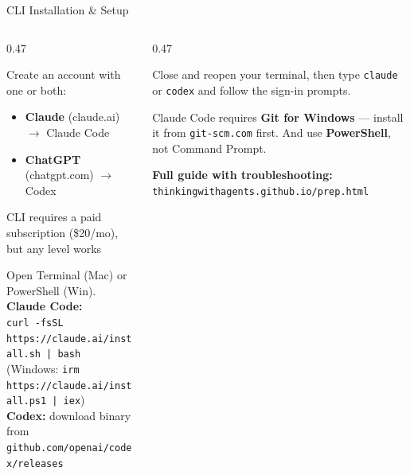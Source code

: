 \documentclass[aspectratio=169, 10pt]{beamer}
\begin{document}
\begin{frame}[fragile]{CLI Installation \& Setup}
\begin{columns}[T]
\begin{column}{0.47\textwidth}
\begin{tcolorbox}[keybox, title={\faUserPlus\quad Step 1: Accounts}]
\small
Create an account with one or both:
\begin{itemize}\setlength{\itemsep}{1pt}
  \item \textbf{Claude} (claude.ai) $\rightarrow$ Claude Code
  \item \textbf{ChatGPT} (chatgpt.com) $\rightarrow$ Codex
\end{itemize}
\vskip2pt
CLI requires a paid subscription (\$20/mo), but any level works
\end{tcolorbox}
\vskip3pt
\begin{tcolorbox}[keybox, title={\faTerminal\quad Step 2: Install}]
\small
Open Terminal (Mac) or PowerShell (Win).\\[4pt]
\textbf{Claude Code:}\\[2pt]
\texttt{\scriptsize curl -fsSL https://claude.ai/install.sh | bash}\\[2pt]
{\scriptsize (Windows: \texttt{irm https://claude.ai/install.ps1 | iex})}\\[4pt]
\textbf{Codex:} download binary from\\[1pt]
{\scriptsize\texttt{github.com/openai/codex/releases}}
\end{tcolorbox}
\end{column}
\begin{column}{0.47\textwidth}
\begin{tcolorbox}[keybox, title={\faPlay\quad Step 3: Launch}]
\small
Close and reopen your terminal, then type \texttt{claude} or \texttt{codex} and follow the sign-in prompts.
\end{tcolorbox}
\vskip3pt
\begin{tcolorbox}[keybox, title={\faExclamationTriangle\quad Windows note}]
\small
Claude Code requires \textbf{Git for Windows} --- install it from \texttt{git-scm.com} first. And use \textbf{PowerShell}, not Command Prompt.
\end{tcolorbox}
\vskip3pt
\begin{tcolorbox}[accentbox, top=2pt, bottom=2pt]
\scriptsize
\textbf{Full guide with troubleshooting:}\\
\texttt{thinkingwithagents.github.io/prep.html}
\end{tcolorbox}
\end{column}
\end{columns}
\end{frame}
\end{document}
